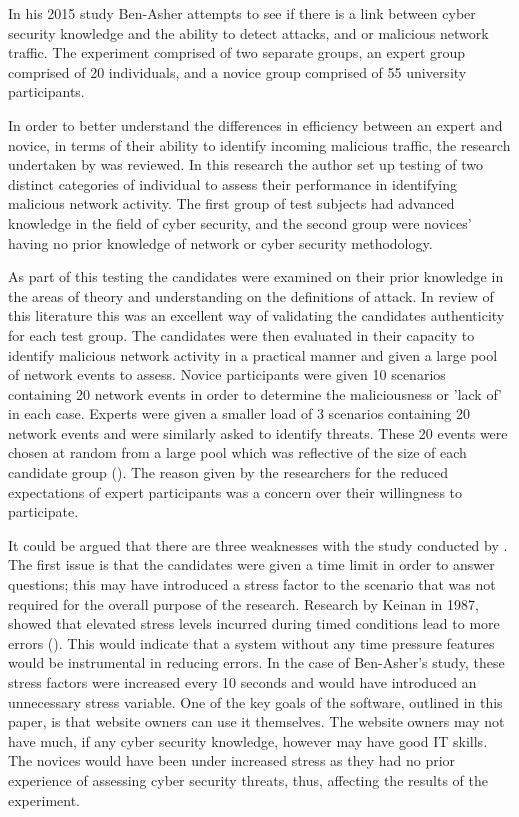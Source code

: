 In his 2015 study Ben-Asher attempts to see if there is a link between cyber security knowledge and the ability to detect attacks, and or malicious network traffic. The experiment comprised of two separate groups, an expert group comprised of 20 individuals, and a novice group comprised of 55 university participants. 

In order to better understand the differences in efficiency between an expert and novice, in terms of their ability to identify incoming malicious traffic, the research undertaken by \citeauthor{ben2015effects} was reviewed. In this research the author set up testing of two distinct categories of individual to assess their performance in identifying malicious network activity. The first group of test subjects had advanced knowledge in the field of cyber security, and the second group were novices' having no prior knowledge of network or cyber security methodology. 

As part of this testing the candidates were examined on their prior knowledge in the areas of theory and understanding on the definitions of attack. In review of this literature this was an excellent way of validating the candidates authenticity for each test group. The candidates were then evaluated in their capacity to identify malicious network activity in a practical manner and given a large pool of network events to assess. Novice participants were given 10 scenarios containing 20 network events in order to determine the maliciousness or 'lack of' in each case. Experts were given a smaller load of 3 scenarios containing 20 network events and were similarly asked to identify threats. These 20 events were chosen at random from a large pool which was reflective of the size of each candidate group (\cite{ben2015effects}). The reason given by the researchers for the reduced expectations of expert participants was a concern over their willingness to participate.

It could be argued that there are three weaknesses with the study conducted by \citeauthor{ben2015effects}. The first issue is that the candidates were given a time limit in order to answer questions; this may have introduced a stress factor to the scenario that was not required for the overall purpose of the research. Research by Keinan in 1987, showed that elevated stress levels incurred during timed conditions lead to more errors (\cite{Keinan}). This would indicate that a system without any time pressure features would be instrumental in reducing errors. In the case of Ben-Asher's study, these stress factors were increased every 10 seconds and would have introduced an unnecessary stress variable. One of the key goals of the software, outlined in this paper, is that website owners can use it themselves. The website owners may not have much, if any cyber security knowledge, however may have good IT skills. The novices would have been under increased stress as they had no prior experience of assessing cyber security threats, thus, affecting the results of the experiment.

